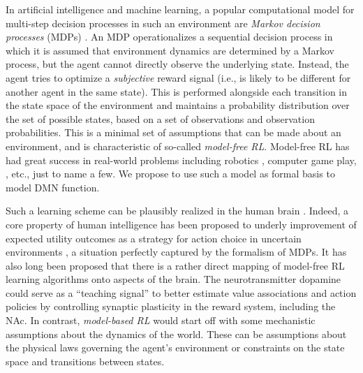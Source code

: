 \documentclass[10pt,letterpaper]{article}
\begin{document}
In artificial intelligence and machine learning, a popular computational model for
multi-step decision processes in such an environment are
\textit{Markov decision processes} (MDPs) \citep{sutton1998reinforcement}.
An MDP operationalizes a sequential decision process
in which it is assumed that environment dynamics are determined by a Markov process,
but the agent cannot directly observe the underlying state.
Instead, the agent tries to optimize a \textit{subjective} reward
signal (i.e., is likely to be different for another agent in the same state).
This is performed alongside each transition in the state space of the environment
 and maintains a probability distribution over the set of possible
states, based on a set of observations and observation probabilities.
This is a minimal set of assumptions that can be made about an environment,
and is characteristic of so-called \textit{model-free RL}. Model-free RL has had great success in real-world problems including robotics
\citep{abbeel2004,andrewng}, computer game play, \citep{mnih2015,silver2016mastering}, etc., just to name a few.
We propose to use such a model as formal basis to model DMN function.

Such a learning scheme can be plausibly realized in the human brain \citep{doherty2015structure}. Indeed,
a core property of human intelligence has been proposed to underly improvement
of expected utility outcomes as a strategy for action choice in uncertain
environments \citep{gershman2015computational}, a situation perfectly captured by the formalism of MDPs.
It has also long been proposed \citep{dayan2008decision} that there
is a rather direct mapping of model-free RL learning algorithms
onto aspects of the brain.
The neurotransmitter dopamine could serve
as a ``teaching signal'' to better estimate value associations
and action policies by controlling
synaptic plasticity in the reward system, including the NAc.
In contrast, \textit{model-based RL} would start off with some mechanistic assumptions about the dynamics of the world.
These can be assumptions about the physical laws governing the agent's environment or constraints on the state space and transitions between states.
%
\end{document}
